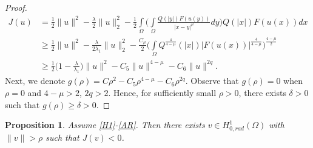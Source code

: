 \documentclass[11pt]{amsart}
\numberwithin{equation}{section}
\newtheorem{prop}[thm]{Proposition}
\newcommand{\hr}{H^1_{0, rad}(\Omega)}
\newcommand{\1}{\frac{1}{2}}
\begin{document}
\begin{proof}
		\begin{align}
			J(u) &= \frac{1}{2} \|u\|^2 - \frac{\lambda}{2} \|u\|^2_2 - \1\int\limits_\Omega\Bigg( \int\limits_\Omega \frac{Q(|y|)F(u(y))}{|x-y|^\mu}dy\Bigg) Q(|x|)F(u(x))dx\nonumber\\
			& \geq \frac{1}{2} \|u\|^2 - \frac{\lambda}{2\lambda_1} \|u\|^2_2 - \frac{ C_{\mu}}{2} \Bigg(\int\limits_\Omega Q^{\frac{4}{4-\mu}}(|x|) |F(u(x))|^{\frac{4}{4-\mu}} \Bigg)^{\frac{4-\mu}{2}} \nonumber\\
			& \geq  \frac{1}{2}\Bigg(1-\frac{\lambda}{\lambda_1}\Bigg) \|u\|^2 - C_5 \|u\|^{4-\mu} -C_6 \|u\|^{2q}. \label{3}
		\end{align}
		Next, we denote $g(\rho)=C\rho^2-C_5\rho^{4-\mu}-C_6\rho^{2q}$. Observe that $g(\rho) = 0$ when $\rho = 0$ and $4-\mu>2$, $2q>2$. Hence, for sufficiently small $\rho>0$, there exists $\delta>0$ such that $g(\rho) \geq \delta >0$.
	\end{proof}
	\begin{prop}
		\label{prop4.3}
		Assume \eqref{H1}-\eqref{AR}. Then there exists $v \in \hr$ with $\|v\|>\rho$ such that $J(v)<0$.
	\end{prop}
\end{document}
